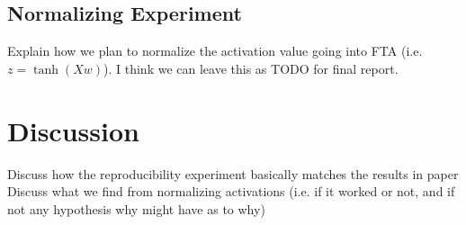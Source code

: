 \documentclass{article}
\begin{document}
\subsection{Normalizing Experiment} \label{sub-sec:normalize experiments}
Explain how we plan to normalize the activation value going into FTA (i.e. $z = \tanh(X w)$).
I think we can leave this as TODO for final report.


\section{Discussion} \label{sec:discussion}
Discuss how the reproducibility experiment basically matches the results in \cite[]{pan2019fuzzy} paper
Discuss what we find from normalizing activations (i.e. if it worked or not, and if not any hypothesis why might have as to why)


\newpage

\end{document}
